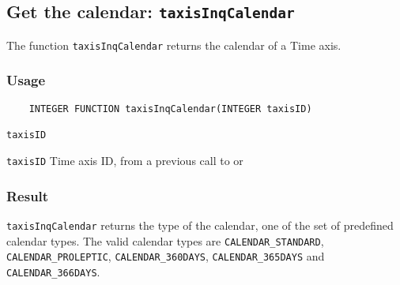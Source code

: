 \subsection{Get the calendar: \texttt{taxisInqCalendar}}
\label{taxisInqCalendar}

The function {\texttt{taxisInqCalendar}} returns the calendar of a Time axis.

\subsubsection*{Usage}

\begin{verbatim}
    INTEGER FUNCTION taxisInqCalendar(INTEGER taxisID)
\end{verbatim}

\hspace*{4mm}\begin{minipage}[]{15cm}
\begin{deflist}{\texttt{taxisID}\ }
\item[\texttt{taxisID}]
Time axis ID, from a previous call to {} or {}

\end{deflist}
\end{minipage}

\subsubsection*{Result}

{\texttt{taxisInqCalendar}} returns the type of the calendar,
one of the set of predefined {\CDI} calendar types.
The valid {\CDI} calendar types are {\texttt{CALENDAR\_STANDARD}}, {\texttt{CALENDAR\_PROLEPTIC}},
{\texttt{CALENDAR\_360DAYS}}, {\texttt{CALENDAR\_365DAYS}} and {\texttt{CALENDAR\_366DAYS}}.

